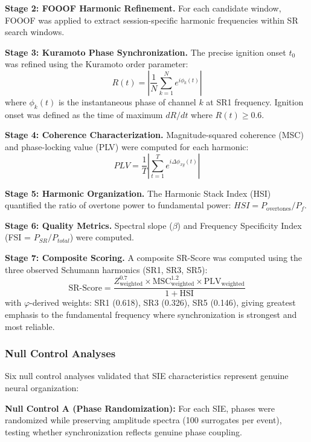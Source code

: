\documentclass[11pt,a4paper]{article}
\newcommand{\phisym}{\varphi}
\begin{document}
\textbf{Stage 2: FOOOF Harmonic Refinement.}
For each candidate window, FOOOF was applied to extract session-specific harmonic frequencies within SR search windows.

\textbf{Stage 3: Kuramoto Phase Synchronization.}
The precise ignition onset $t_0$ was refined using the Kuramoto order parameter:
\begin{equation}
R(t) = \left| \frac{1}{N} \sum_{k=1}^{N} e^{i\phi_k(t)} \right|
\end{equation}
where $\phi_k(t)$ is the instantaneous phase of channel $k$ at SR1 frequency. Ignition onset was defined as the time of maximum $dR/dt$ where $R(t) \geq 0.6$.

\textbf{Stage 4: Coherence Characterization.}
Magnitude-squared coherence (MSC) and phase-locking value (PLV) \parencite{lachaux1999plv} were computed for each harmonic:
\begin{equation}
PLV = \frac{1}{T}\left|\sum_{t=1}^{T} e^{i\Delta\phi_{xy}(t)}\right|
\end{equation}

\textbf{Stage 5: Harmonic Organization.}
The Harmonic Stack Index (HSI) quantified the ratio of overtone power to fundamental power: $HSI = P_{\text{overtones}} / P_f$.

\textbf{Stage 6: Quality Metrics.}
Spectral slope ($\beta$) and Frequency Specificity Index (FSI = $P_{SR}/P_{total}$) were computed.

\textbf{Stage 7: Composite Scoring.}
A composite SR-Score was computed using the three observed Schumann harmonics (SR1, SR3, SR5):
\begin{equation}
\text{SR-Score} = \frac{Z_{\text{weighted}}^{0.7} \times \text{MSC}_{\text{weighted}}^{1.2} \times \text{PLV}_{\text{weighted}}}{1 + \text{HSI}}
\end{equation}
with $\phisym$-derived weights: SR1 (0.618), SR3 (0.326), SR5 (0.146), giving greatest emphasis to the fundamental frequency where synchronization is strongest and most reliable.

\subsubsection{Null Control Analyses}

Six null control analyses validated that SIE characteristics represent genuine neural organization:

\textbf{Null Control A (Phase Randomization):} For each SIE, phases were randomized while preserving amplitude spectra (100 surrogates per event), testing whether synchronization reflects genuine phase coupling.
\end{document}
